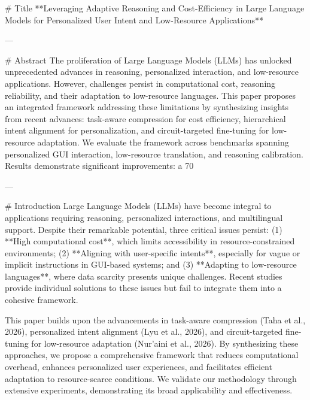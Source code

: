 # Title  
**Leveraging Adaptive Reasoning and Cost-Efficiency in Large Language Models for Personalized User Intent and Low-Resource Applications**

---

# Abstract  
The proliferation of Large Language Models (LLMs) has unlocked unprecedented advances in reasoning, personalized interaction, and low-resource applications. However, challenges persist in computational cost, reasoning reliability, and their adaptation to low-resource languages. This paper proposes an integrated framework addressing these limitations by synthesizing insights from recent advances: task-aware compression for cost efficiency, hierarchical intent alignment for personalization, and circuit-targeted fine-tuning for low-resource adaptation. We evaluate the framework across benchmarks spanning personalized GUI interaction, low-resource translation, and reasoning calibration. Results demonstrate significant improvements: a 70%

---

# Introduction  
Large Language Models (LLMs) have become integral to applications requiring reasoning, personalized interactions, and multilingual support. Despite their remarkable potential, three critical issues persist: (1) **High computational cost**, which limits accessibility in resource-constrained environments; (2) **Aligning with user-specific intents**, especially for vague or implicit instructions in GUI-based systems; and (3) **Adapting to low-resource languages**, where data scarcity presents unique challenges. Recent studies provide individual solutions to these issues but fail to integrate them into a cohesive framework.

This paper builds upon the advancements in task-aware compression (Taha et al., 2026), personalized intent alignment (Lyu et al., 2026), and circuit-targeted fine-tuning for low-resource adaptation (Nur’aini et al., 2026). By synthesizing these approaches, we propose a comprehensive framework that reduces computational overhead, enhances personalized user experiences, and facilitates efficient adaptation to resource-scarce conditions. We validate our methodology through extensive experiments, demonstrating its broad applicability and effectiveness.

